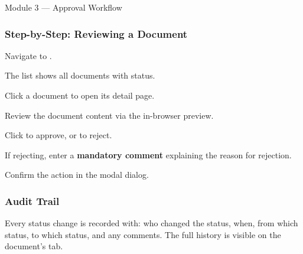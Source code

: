 \begin{ugModule}{Module 3 --- Approval Workflow}
  \subsubsection*{Step-by-Step: Reviewing a Document}
  \begin{ugSteps}
    \item Navigate to .
    \item The list shows all documents with
           status.
    \item Click a document to open its detail page.
    \item Review the document content via the in-browser preview.
    \item Click  to approve, or
           to reject.
    \item If rejecting, enter a \textbf{mandatory comment}
          explaining the reason for rejection.
    \item Confirm the action in the modal dialog.
  \end{ugSteps}

  \subsubsection*{Audit Trail}
  Every status change is recorded with: who changed the status,
  when, from which status, to which status, and any comments.
  The full history is visible on the document's
   tab.
\end{ugModule}

\vspace{10pt}

